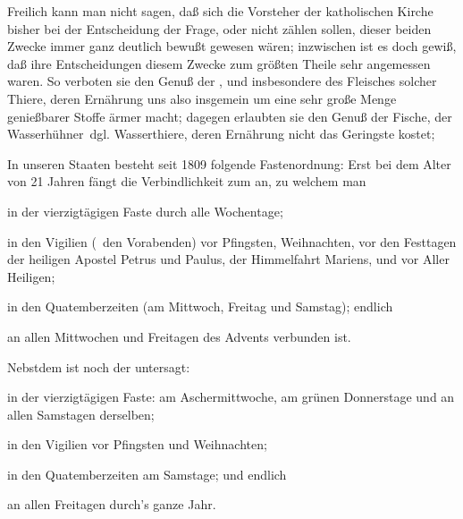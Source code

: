 \begin{aufza}
Freilich kann man nicht sagen, daß sich die Vorsteher der katholischen Kirche bisher bei der Entscheidung der Frage,  oder nicht zählen sollen, dieser beiden Zwecke immer ganz deutlich bewußt gewesen wären; inzwischen ist es doch gewiß, daß ihre Entscheidungen diesem Zwecke zum größten Theile sehr angemessen waren.
So verboten sie den Genuß der , und insbesondere des Fleisches solcher Thiere,  deren Ernährung uns also insgemein um eine sehr große Menge genießbarer Stoffe ärmer macht;
dagegen erlaubten sie den Genuß der Fische, der Wasserhühner \ua\,dgl. Wasserthiere, deren Ernährung nicht das Geringste kostet; \usw\
\item In unseren Staaten besteht seit 1809 folgende Fastenordnung: Erst bei dem Alter von 21 Jahren fängt die Verbindlichkeit zum  an, zu welchem man
\begin{aufzb}
\item in der vierzigtägigen Faste durch alle Wochentage;
\item in den Vigilien (\dh\  den Vorabenden) vor Pfingsten, Weihnachten, vor den Festtagen der heiligen Apostel Petrus und Paulus, der Himmelfahrt Mariens, und vor Aller Heiligen;
\item in den Quatemberzeiten (am Mittwoch, Freitag und Samstag); endlich
\item an allen Mittwochen und Freitagen des Advents verbunden ist. 
\end{aufzb}
Nebstdem ist noch der  untersagt:
\begin{aufzb}
\item in der vierzigtägigen Faste: am Aschermittwoche, am grünen Donnerstage und an allen Samstagen derselben;
\item in den Vigilien vor Pfingsten und Weihnachten;
\item in den Quatemberzeiten am Samstage; und endlich
\item an allen Freitagen durch's ganze Jahr.
\end{aufzb}
\end{aufza}
